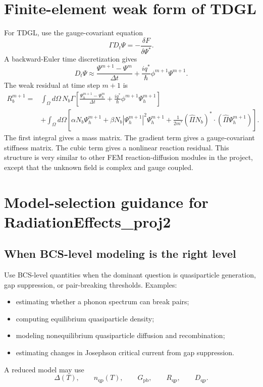 \documentclass[11pt]{article}
\numberwithin{equation}{section}
\newcommand{\Ord}{\Psi}
\newcommand{\GammaTD}{\Gamma}
\begin{document}
\section{Finite-element weak form of TDGL}

For TDGL, use the gauge-covariant equation
\begin{equation}
\GammaTD D_t\Ord=-\frac{\delta F}{\delta\Ord^*}.
\end{equation}
A backward-Euler time discretization gives
\begin{equation}
D_t\Ord\approx \frac{\Ord^{m+1}-\Ord^m}{\Delta t}+\frac{i q^*}{\hbar}\phi^{m+1}\Ord^{m+1}.
\end{equation}
The weak residual at time step $m+1$ is
\begin{align}
R_b^{m+1}=&\int_\Omega d\Omega\,N_b\GammaTD\left[\frac{\Ord_h^{m+1}-\Ord_h^m}{\Delta t}+\frac{i q^*}{\hbar}\phi^{m+1}\Ord_h^{m+1}\right]\\
&+\int_\Omega d\Omega\left[\alpha N_b\Ord_h^{m+1}+\beta N_b|\Ord_h^{m+1}|^2\Ord_h^{m+1}+\frac{1}{2m^*}(\hat{\Pi}N_b)^*\cdot(\hat{\Pi}\Ord_h^{m+1})\right].
\end{align}
The first integral gives a mass matrix. The gradient term gives a gauge-covariant stiffness matrix. The cubic term gives a nonlinear reaction residual. This structure is very similar to other FEM reaction-diffusion modules in the project, except that the unknown field is complex and gauge coupled.

\section{Model-selection guidance for RadiationEffects\_proj2}

\subsection{When BCS-level modeling is the right level}

Use BCS-level quantities when the dominant question is quasiparticle generation, gap suppression, or pair-breaking thresholds. Examples:
\begin{itemize}[leftmargin=2em]
\item estimating whether a phonon spectrum can break pairs;
\item computing equilibrium quasiparticle density;
\item modeling nonequilibrium quasiparticle diffusion and recombination;
\item estimating changes in Josephson critical current from gap suppression.
\end{itemize}
A reduced model may use
\begin{equation}
\Delta(T),\qquad n_{\mathrm{qp}}(T),\qquad G_{\mathrm{pb}},\qquad R_{\mathrm{qp}},\qquad D_{\mathrm{qp}}.
\end{equation}
\end{document}
